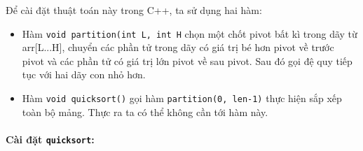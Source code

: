 \documentclass[a4paper,12pt]{report}
\newcommand{\mnt}[1]{\inputminted[frame=single, linenos=true, tabsize=4]{c++}{#1}}
\begin{document}
Để cài đặt thuật toán này trong C++, ta sử dụng hai hàm:

\begin{itemize} 
\item Hàm \texttt{void partition(int L, int H} chọn một chốt pivot bất kì trong dãy từ arr[L...H], chuyển các phần tử trong dãy có giá trị bé hơn pivot về trước pivot và các phần tử có giá trị lớn pivot về sau pivot. Sau đó gọi đệ quy tiếp tục với hai dãy con nhỏ hơn.
\item Hàm \texttt{void quicksort()} gọi hàm \texttt{partition(0, len-1)} thực hiện sắp xếp toàn bộ mảng. Thực ra ta có thể không cần tới hàm này.
\end{itemize}

\paragraph{Cài đặt \texttt{quicksort}: }
\mnt{src/quicksort.cpp}
\end{document}
